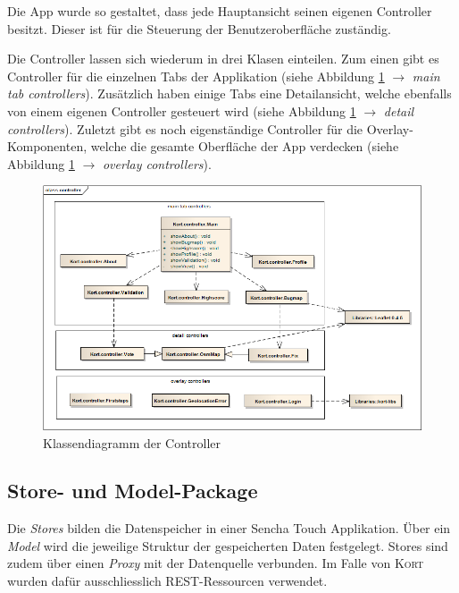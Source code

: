 Die App wurde so gestaltet, dass jede Hauptansicht seinen eigenen Controller besitzt.
Dieser ist für die Steuerung der Benutzeroberfläche zuständig.

Die Controller lassen sich wiederum in drei Klasen einteilen.
Zum einen gibt es Controller für die einzelnen Tabs der Applikation (siehe Abbildung \ref{image-kort-classdiagram-controller} $\rightarrow$ \emph{main tab controllers}).
Zusätzlich haben einige Tabs eine Detailansicht, welche ebenfalls von einem eigenen Controller gesteuert wird (siehe Abbildung \ref{image-kort-classdiagram-controller} $\rightarrow$ \emph{detail controllers}).
Zuletzt gibt es noch eigenständige Controller für die Overlay-Komponenten, welche die gesamte Oberfläche der App verdecken (siehe Abbildung \ref{image-kort-classdiagram-controller} $\rightarrow$ \emph{overlay controllers}).

\begin{figure}[H]
	\centering
	\includegraphics[width=\textwidth]{images/uml/kort-classdiagram-controller}
	\caption{Klassendiagramm der Controller}
	\label{image-kort-classdiagram-controller}
\end{figure}

\subsection{Store- und Model-Package}

Die \emph{Stores} bilden die Datenspeicher in einer Sencha Touch Applikation.
Über ein \emph{Model} wird die jeweilige Struktur der gespeicherten Daten festgelegt.
Stores sind zudem über einen \emph{Proxy} mit der Datenquelle verbunden.
Im Falle von \textsc{Kort} wurden dafür ausschliesslich REST-Ressourcen verwendet.

